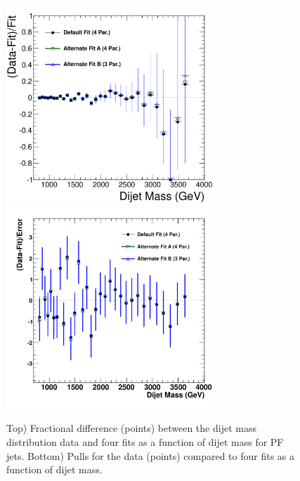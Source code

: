\begin{figure}[!ht]
  \begin{center}
        \includegraphics[width=0.7\textwidth]{Figures/Fractional_Diff_All_pf.pdf}
        \includegraphics[width=0.7\textwidth]{Figures/Pulls_All_pf.pdf}
    \caption{ Top) Fractional difference (points) between the dijet mass distribution 
data and four fits as a function of dijet mass for PF jets.
Bottom) Pulls for the data (points) compared to four fits as a function of dijet mass.}
    \label{dijetmassFits_pf}
  \end{center}
\end{figure}

